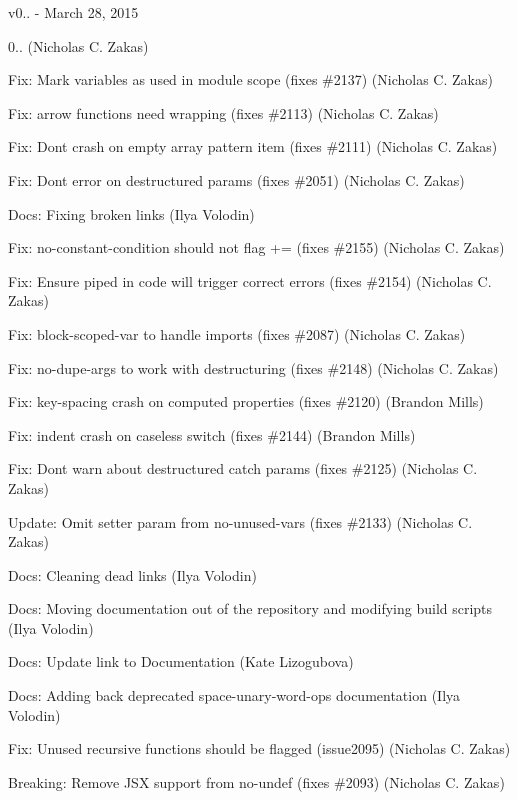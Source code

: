 v0.. -\/ March 28, 2015


\begin{DoxyItemize}
\item 0.. (Nicholas C. Zakas)
\item Fix\+: Mark variables as used in module scope (fixes \#2137) (Nicholas C. Zakas)
\item Fix\+: arrow functions need wrapping (fixes \#2113) (Nicholas C. Zakas)
\item Fix\+: Don\textquotesingle{}t crash on empty array pattern item (fixes \#2111) (Nicholas C. Zakas)
\item Fix\+: Don\textquotesingle{}t error on destructured params (fixes \#2051) (Nicholas C. Zakas)
\item Docs\+: Fixing broken links (Ilya Volodin)
\item Fix\+: no-\/constant-\/condition should not flag += (fixes \#2155) (Nicholas C. Zakas)
\item Fix\+: Ensure piped in code will trigger correct errors (fixes \#2154) (Nicholas C. Zakas)
\item Fix\+: block-\/scoped-\/var to handle imports (fixes \#2087) (Nicholas C. Zakas)
\item Fix\+: no-\/dupe-\/args to work with destructuring (fixes \#2148) (Nicholas C. Zakas)
\item Fix\+: key-\/spacing crash on computed properties (fixes \#2120) (Brandon Mills)
\item Fix\+: indent crash on caseless switch (fixes \#2144) (Brandon Mills)
\item Fix\+: Don\textquotesingle{}t warn about destructured catch params (fixes \#2125) (Nicholas C. Zakas)
\item Update\+: Omit setter param from no-\/unused-\/vars (fixes \#2133) (Nicholas C. Zakas)
\item Docs\+: Cleaning dead links (Ilya Volodin)
\item Docs\+: Moving documentation out of the repository and modifying build scripts (Ilya Volodin)
\item Docs\+: Update link to Documentation (Kate Lizogubova)
\item Docs\+: Adding back deprecated space-\/unary-\/word-\/ops documentation (Ilya Volodin)
\item Fix\+: Unused recursive functions should be flagged (issue2095) (Nicholas C. Zakas)
\item Breaking\+: Remove J\+SX support from no-\/undef (fixes \#2093) (Nicholas C. Zakas)

\end{DoxyItemize}
